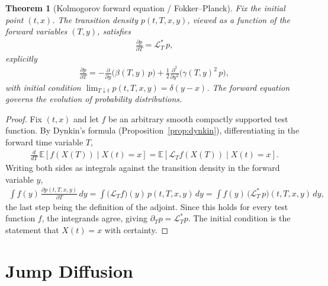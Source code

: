 \documentclass{report}
\theoremstyle{spacedplain}
\newtheorem{theorem}{Theorem}[section]
\theoremstyle{spaceddefinition}
\theoremstyle{spacedremark}
\begin{document}
\begin{theorem}[Kolmogorov forward equation / Fokker--Planck]
Fix the initial point $(t,x)$. The transition density $p(t,T,x,y)$, viewed as a function of the \emph{forward} variables $(T,y)$, satisfies
\begin{align}
    \frac{\partial p}{\partial T} = \mathcal{L}^*_T\,p,
\end{align}
explicitly
\begin{align}
    \frac{\partial p}{\partial T} = -\frac{\partial}{\partial y}\bigl(\beta(T,y)\,p\bigr) + \frac12\frac{\partial^2}{\partial y^2}\bigl(\gamma(T,y)^2\,p\bigr),
\end{align}
with initial condition $\lim_{T\downarrow t}p(t,T,x,y) = \delta(y-x)$. The forward equation governs the evolution of \emph{probability distributions}.
\end{theorem}
\begin{proof}
Fix $(t,x)$ and let $f$ be an arbitrary smooth compactly supported test function. By Dynkin's formula (Proposition~\ref{prop:dynkin}), differentiating in the forward time variable $T$,
\begin{align}
    \frac{d}{dT}\,\mathbb{E}\!\left[f(X(T))\mid X(t)=x\right] = \mathbb{E}\!\left[\mathcal{L}_Tf(X(T))\mid X(t)=x\right].
\end{align}
Writing both sides as integrals against the transition density in the forward variable $y$,
\begin{align}
    \int f(y)\,\frac{\partial p(t,T,x,y)}{\partial T}\,dy = \int \bigl(\mathcal{L}_Tf\bigr)(y)\,p(t,T,x,y)\,dy = \int f(y)\,\bigl(\mathcal{L}^*_T\,p\bigr)(t,T,x,y)\,dy,
\end{align}
the last step being the definition of the adjoint. Since this holds for every test function $f$, the integrands agree, giving $\partial_T p = \mathcal{L}^*_Tp$. The initial condition is the statement that $X(t)=x$ with certainty.
\end{proof}

\section{Jump Diffusion}
\end{document}
